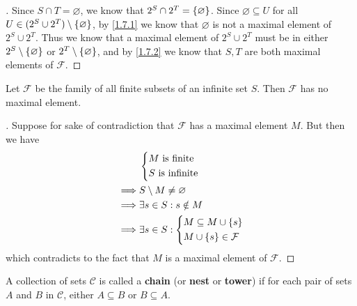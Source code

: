 \begin{proof}[]
  Since \(S \cap T = \varnothing\), we know that \(2^S \cap 2^T = \left\lbrace\varnothing\right\rbrace\).
  Since \(\varnothing \subseteq U\) for all \(U \in (2^S \cup 2^T) \setminus \left\lbrace\varnothing\right\rbrace\), by \cref{1.7.1} we know that \(\varnothing\) is not a maximal element of \(2^S \cup 2^T\).
  Thus we know that a maximal element of \(2^S \cup 2^T\) must be in either \(2^S \setminus \left\lbrace\varnothing\right\rbrace\) or \(2^T \setminus \left\lbrace\varnothing\right\rbrace\), and by \cref{1.7.2} we know that \(S, T\) are both maximal elements of \(\mathcal{F}\).
\end{proof}

\begin{eg}\label{1.7.4}
  Let \(\mathcal{F}\) be the family of all finite subsets of an infinite set \(S\).
  Then \(\mathcal{F}\) has no maximal element.
\end{eg}

\begin{proof}[]
  Suppose for sake of contradiction that \(\mathcal{F}\) has a maximal element \(M\).
  But then we have
  \begin{align*}
             & \begin{dcases}
                 M \text{ is finite} \\
                 S \text{ is infinite}
               \end{dcases}                            \\
    \implies & S \setminus M \neq \varnothing                  \\
    \implies & \exists s \in S : s \notin M                    \\
    \implies & \exists s \in S : \begin{dcases}
                                   M \subseteq M \cup \left\lbrace s\right\rbrace \\
                                   M \cup \left\lbrace s\right\rbrace \in \mathcal{F}
                                 \end{dcases}
  \end{align*}
  which contradicts to the fact that \(M\) is a maximal element of \(\mathcal{F}\).
\end{proof}

\begin{defn}\label{1.7.5}
  A collection of sets \(\mathcal{C}\) is called a \textbf{chain} (or \textbf{nest} or \textbf{tower}) if for each pair of sets \(A\) and \(B\) in \(\mathcal{C}\), either \(A \subseteq B\) or \(B \subseteq A\).
\end{defn}

